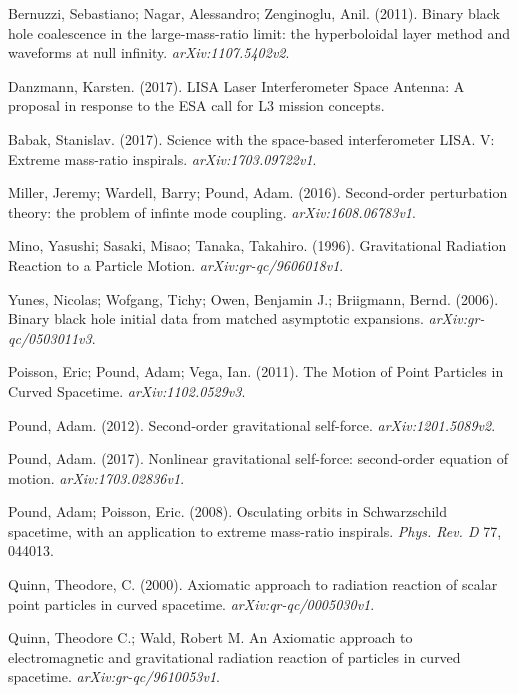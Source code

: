 Bernuzzi, Sebastiano; Nagar, Alessandro; Zenginoglu, Anil. (2011). Binary black hole coalescence in the large-mass-ratio limit: the hyperboloidal layer method and waveforms at null infinity. {\em arXiv:1107.5402v2}.

Danzmann, Karsten. (2017). LISA Laser Interferometer Space Antenna: A proposal in response to the ESA call for L3 mission concepts. 

Babak, Stanislav. (2017). Science with the space-based interferometer LISA. V: Extreme mass-ratio inspirals. {\em arXiv:1703.09722v1}.

Miller, Jeremy; Wardell, Barry; Pound, Adam. (2016). Second-order perturbation theory: the problem of infinte mode coupling. {\em arXiv:1608.06783v1}.

Mino, Yasushi; Sasaki, Misao; Tanaka, Takahiro. (1996). Gravitational Radiation Reaction to a Particle Motion. {\em arXiv:gr-qc/9606018v1}.

Yunes, Nicolas; Wofgang, Tichy; Owen, Benjamin J.; Briigmann, Bernd. (2006). Binary black hole initial data from matched asymptotic expansions. {\em arXiv:gr-qc/0503011v3}.

Poisson, Eric; Pound, Adam; Vega, Ian. (2011). The Motion of Point Particles in Curved Spacetime. {\em arXiv:1102.0529v3}.

Pound, Adam. (2012). Second-order gravitational self-force. {\em arXiv:1201.5089v2}.

Pound, Adam. (2017). Nonlinear gravitational self-force: second-order equation of motion. {\em arXiv:1703.02836v1}.

Pound, Adam; Poisson, Eric. (2008). Osculating orbits in Schwarzschild spacetime, with an application to extreme mass-ratio inspirals. {\em Phys. Rev. D} 77, 044013.

Quinn, Theodore, C. (2000). Axiomatic approach to radiation reaction of scalar point particles in curved spacetime. {\em arXiv:qr-qc/0005030v1}.

Quinn, Theodore C.; Wald, Robert M. An Axiomatic approach to electromagnetic and gravitational radiation reaction of particles in curved spacetime. {\em arXiv:gr-qc/9610053v1}.

